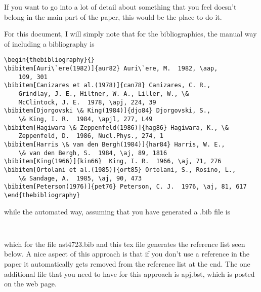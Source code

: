 \documentclass{emulateapj}
\begin{document}
If you want to go into a lot of detail about something that you feel doesn't belong
in the main part of the paper, this would be the place to do it. 

For this document, I will simply note that for the bibliographies, the manual
way of including a bibliography is
\begin{verbatim}
\begin{thebibliography}{}
\bibitem[Auri\`ere(1982)]{aur82} Auri\`ere, M.  1982, \aap,
    109, 301
\bibitem[Canizares et al.(1978)]{can78} Canizares, C. R.,
    Grindlay, J. E., Hiltner, W. A., Liller, W., \&
    McClintock, J. E.  1978, \apj, 224, 39
\bibitem[Djorgovski \& King(1984)]{djo84} Djorgovski, S.,
    \& King, I. R.  1984, \apjl, 277, L49
\bibitem[Hagiwara \& Zeppenfeld(1986)]{hag86} Hagiwara, K., \&
    Zeppenfeld, D.  1986, Nucl.Phys., 274, 1
\bibitem[Harris \& van den Bergh(1984)]{har84} Harris, W. E.,
    \& van den Bergh, S.  1984, \aj, 89, 1816
\bibitem[King(1966)]{kin66}  King, I. R.  1966, \aj, 71, 276
\bibitem[Ortolani et al.(1985)]{ort85} Ortolani, S., Rosino, L.,
    \& Sandage, A.  1985, \aj, 90, 473
\bibitem[Peterson(1976)]{pet76} Peterson, C. J.  1976, \aj, 81, 617
\end{thebibliography}
\end{verbatim}

while the automated way, assuming that you have generated a .bib file is
\begin{verbatim}


\end{verbatim}

which for the file ast4723.bib and this tex file generates the reference list
seen below. A nice aspect of this approach is that if you don't use a reference
in the paper it automatically gets removed from the reference list at the end.
The one additional file that you need to have for this approach is apj.bst,
which is posted on the web page.





\clearpage
\end{document}
